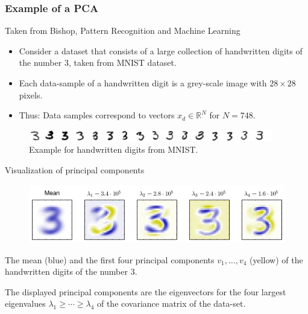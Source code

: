 \begin{frame}\frametitle{Example of a PCA}
Taken from Bishop, Pattern Recognition and Machine Learning 
\begin{itemize}
\item Consider a dataset that consists of a large collection of handwritten digits of the number $3$, taken from MNIST dataset.
\item Each data-sample of a handwritten digit is a grey-scale image with $28\times 28$ pixels. 
\item Thus: Data samples correspond to vectors $x_d\in \mathbb {R}^N$ for $N=748$. 
\end{itemize}
\begin{figure}
\centering
\includegraphics[width=0.95\textwidth]{number_3_MNIST.png}
\captionsetup{labelformat=empty}
\caption{Example for handwritten digits from MNIST.}
\end{figure}
\end{frame}

\begin{frame}{ Visualization of principal components} 
\begin{figure}
\includegraphics[width=.75\textwidth]{FigurePCA_1.png}
\end{figure}
\bit
\item The mean (blue) and the first four principal components $v_1,\dots,v_4$ (yellow) of the handwritten digits of the number 3.
\item The displayed principal components are the eigenvectors for the four largest eigenvalues $\lambda_1\geq\cdots\geq \lambda_4$ of the covariance matrix of the data-set.
\eit
\end{frame}

